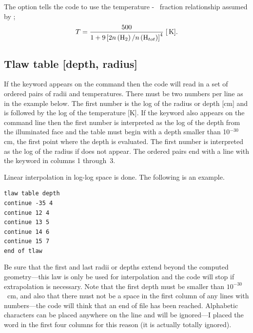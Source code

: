 The  option tells the code to use
the temperature - \htwo\ fraction
relationship assumed by \citet{Sternberg1999};
\begin{equation}
T = \frac{{500}}{{1 + 9\left[ {2n\left( {{\mathrm{H}}_2 } \right)/n\left(
{{\mathrm{H}}_{tot} } \right)} \right]^4 }}
 \; [{\rm\thinspace K}].
\end{equation}

\subsection{Tlaw table [depth, radius]}

If the keyword  appears on the 
command then the code will read
in a set of ordered pairs of radii and temperatures.
There must be two numbers per line
as in the example below.
The first number is the log of the radius or depth
[cm] and is followed by the log of the temperature [K].
If the
keyword  also appears on the command line then
the first number is
interpreted as the log of the depth from the illuminated face
and the table
must begin with a depth smaller than 10$^{-30}$ cm,
the first point where the
depth is evaluated.
The first number is interpreted as the log of the radius
if  does not appear.
The ordered pairs end with a line with the keyword
 in columns 1 through~3.

Linear interpolation in log-log space is done.
The following is an example.
\begin{verbatim}
tlaw table depth
continue -35 4
continue 12 4
continue 13 5
continue 14 6
continue 15 7
end of tlaw
\end{verbatim}

Be sure that the first and last radii or depths extend beyond the computed
geometry---this law is only be used for interpolation and the code will
stop if extrapolation is necessary.
Note that the first depth must be
smaller than $10^{-30}$~cm,
and also that there must not be a space in the first
column of any lines with numbers---the code will think that an end of file
has been reached.
Alphabetic characters can be placed anywhere on the line
and will be ignored---I placed the word
 in the first four columns
for this reason (it is actually totally ignored).

